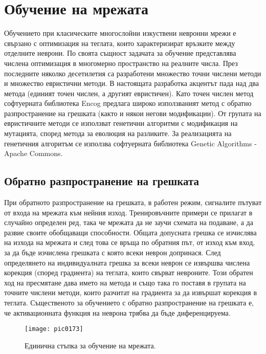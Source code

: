 \newpage
\chapter{Обучение на мрежата}
\label{chapter07}

Обучението при класическите многослойни изкуствени невронни мрежи е свързано с оптимизация на теглата, които характеризират връзките между отделните неврони. По своята същност задачата за обучение представлява числена оптимизация в многомерно пространство на реалните числа. През последните няколко десетилетия са разработени множество точни числени методи и множество евристични методи. В настоящата разработка акцентът пада над два метода (единият точен числен, а другият евристичен). Като точен числен метод софтуерната библиотека Encog предлага широко използваният метод с обратно разпространение на грешката (както и някои негови модификации). От групата на евристичните методи се използват генетични алгоритми с модификация на мутацията, според метода за еволюция на разликите. За реализацията на генетичния алгоритъм се използва софтуерната библиотека Genetic Algorithms - Apache Commons.

\section{Обратно разпространение на грешката}

При обратното разпространение на грешката, в работен режим, сигналите пътуват от входа на мрежата към нейния изход. Тренировъчните примери се прилагат в случайно определен ред, така че мрежата да не заучи схемата на подаване, а да развие своите обобщаващи способности. Общата допусната грешка се изчислява на изхода на мрежата и след това се връща по обратния път, от изход към вход, за да бъде изчислена грешката с която всеки неврон допринася. След определянето на индивидуалната грешка за всеки неврон се извършва числена корекция (според градиента) на теглата, които свърват невроните. Този обратен ход на пресмятане дава името на метода и също така го поставя в групата на точните числени методи, които разчитат на градиента за да извършат корекция в теглата. Същественото за обучението с обратно разпространение на грешката е, че активационната функция на неврона трябва да бъде диференцируема. 

\begin{figure}[h]
  \centering
  \texttt{[image: pic0173]}
  \caption{Единична стъпка за обучение на мрежата.}
\label{fig:pic0173}
\end{figure}
\FloatBarrier

